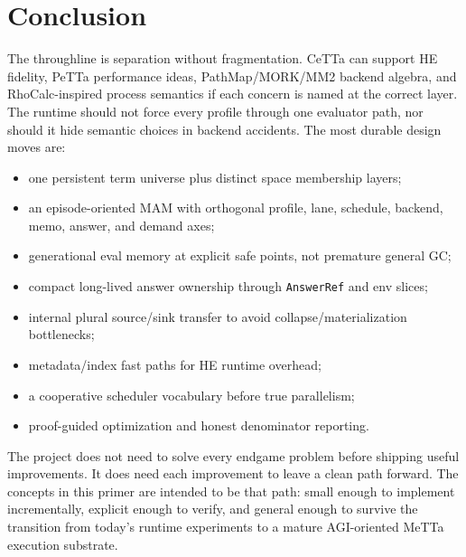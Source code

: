 \documentclass[11pt]{article}
\newcommand{\CeTTa}{CeTTa}
\newcommand{\MeTTa}{MeTTa}
\newcommand{\PeTTa}{PeTTa}
\newcommand{\HE}{HE}
\newcommand{\MAM}{MAM}
\newcommand{\PathMap}{PathMap}
\newcommand{\MORK}{MORK}
\newcommand{\MM}{MM2}
\newcommand{\RhoCalc}{RhoCalc}
\newcommand{\AnswerRef}{\texttt{AnswerRef}}
\begin{document}
\section{Conclusion}

The throughline is separation without fragmentation.  \CeTTa{} can support \HE{} fidelity, \PeTTa{} performance ideas, \PathMap{}/\MORK{}/\MM{} backend algebra, and \RhoCalc{}-inspired process semantics if each concern is named at the correct layer.  The runtime should not force every profile through one evaluator path, nor should it hide semantic choices in backend accidents.  The most durable design moves are:

\begin{itemize}[leftmargin=*]
  \item one persistent term universe plus distinct space membership layers;
  \item an episode-oriented \MAM{} with orthogonal profile, lane, schedule, backend, memo, answer, and demand axes;
  \item generational eval memory at explicit safe points, not premature general GC;
  \item compact long-lived answer ownership through \AnswerRef{} and env slices;
  \item internal plural source/sink transfer to avoid collapse/materialization bottlenecks;
  \item metadata/index fast paths for \HE{} runtime overhead;
  \item a cooperative scheduler vocabulary before true parallelism;
  \item proof-guided optimization and honest denominator reporting.
\end{itemize}

The project does not need to solve every endgame problem before shipping useful improvements.  It does need each improvement to leave a clean path forward.  The concepts in this primer are intended to be that path: small enough to implement incrementally, explicit enough to verify, and general enough to survive the transition from today's runtime experiments to a mature AGI-oriented \MeTTa{} execution substrate.
\end{document}
